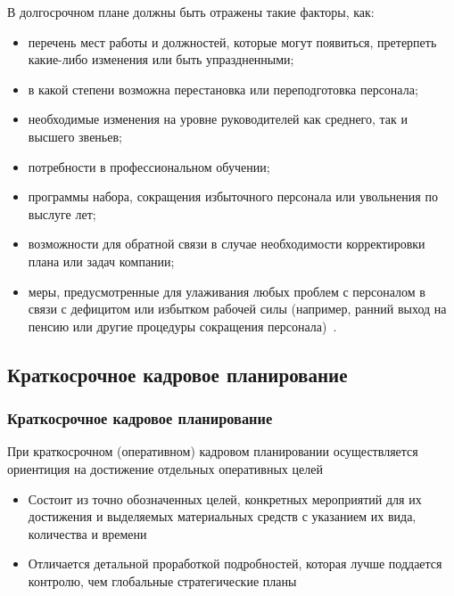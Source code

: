 \documentclass{../industrial-development}
\begin{document}
\lecturenotes

В долгосрочном плане должны быть отражены такие факторы, как:
 \begin{itemize}
\item перечень мест работы и должностей, которые могут появиться, претерпеть какие-либо изменения или быть упраздненными;

\item в какой степени возможна перестановка или переподготовка персонала;

\item необходимые изменения на уровне руководителей как среднего, так и высшего звеньев;

\item потребности в профессиональном обучении;

\item программы набора, сокращения избыточного персонала или увольнения по выслуге лет;

\item возможности для обратной связи в случае необходимости корректировки плана или задач компании;

\item меры, предусмотренные для улаживания любых проблем с персоналом в связи с дефицитом или избытком рабочей силы (например, ранний выход на пенсию или другие процедуры сокращения персонала)~\cite[с.~86--87]{Ivanova}.
  \end{itemize}

\subsection{Краткосрочное кадровое планирование}
\begin{frame} \frametitle{Краткосрочное кадровое планирование}
При краткосрочном (оперативном) кадровом планировании осуществляется ориентиция на достижение отдельных оперативных целей
  \begin{itemize}

\item Состоит из точно обозначенных целей, конкретных мероприятий для их достижения и выделяемых материальных средств с указанием их вида, количества и времени
\item Отличается детальной проработкой подробностей, которая лучше поддается контролю, чем глобальные стратегические планы
  \end{itemize}
\end{frame}
\end{document}
